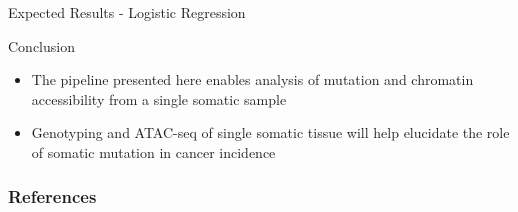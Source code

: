 \documentclass{beamer}
\begin{document}
\begin{frame}{Expected Results - Logistic Regression}
\end{frame}

\begin{frame}{Conclusion}
\begin{itemize}
	\item The pipeline presented here enables analysis of mutation and chromatin accessibility from a single somatic sample
	\item Genotyping and ATAC-seq of single somatic tissue will help elucidate the role of somatic mutation in cancer incidence
\end{itemize}
\end{frame}

\begin{frame}[t, allowframebreaks]
\frametitle{References}
\printbibliography
\end{frame}
\end{document}
